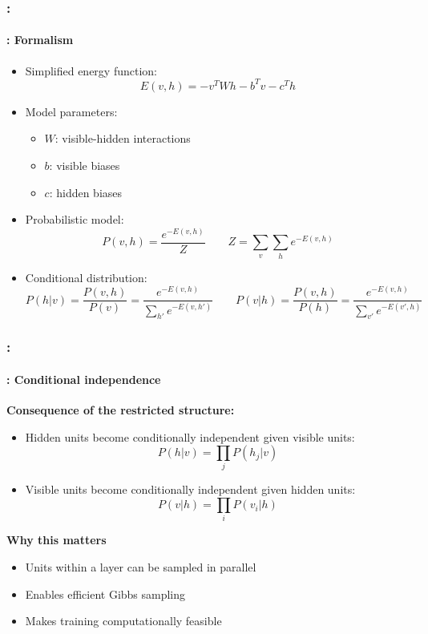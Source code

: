 \documentclass[xcolor=table]{beamer}
\begin{document}
	\begin{frame}
		\frametitle{\insertshortsubtitle: \insertsection}
		\framesubtitle{\insertsubsection: Formalism}
		
		\begin{itemize}
			
			\item Simplified energy function:
			\[
			E(v,h) = - v^T W h - b^T v - c^T h
			\]
			
			\item Model parameters:
			\begin{itemize}
				\item $W$: visible-hidden interactions
				\item $b$: visible biases
				\item $c$: hidden biases
			\end{itemize}
			
			\vspace{0.5em}
			
			\item Probabilistic model:
			\[
			P(v,h) = \frac{e^{-E(v,h)}}{Z} \quad\quad Z = \sum_v \sum_h e^{-E(v,h)}
			\]
			
			\item Conditional distribution:
			\[
			P(h|v) = \frac{P(v,h)}{P(v)} = \frac{e^{-E(v,h)}}{\sum_{h'} e^{-E(v,h')}}
			\qquad
			P(v|h) = \frac{P(v,h)}{P(h)} = \frac{e^{-E(v,h)}}{\sum_{v'} e^{-E(v',h)}}
			\]
			
		\end{itemize}
		
	\end{frame}
	
	\begin{frame}
		\frametitle{\insertshortsubtitle: \insertsection}
		\framesubtitle{\insertsubsection: Conditional independence}
		
		\textbf{Consequence of the restricted structure:}
		
		\begin{itemize}
			\item Hidden units become conditionally independent given visible units:
			\[
			P(h|v) = \prod_j P(h_j|v)
			\]
			
			\item Visible units become conditionally independent given hidden units:
			\[
			P(v|h) = \prod_i P(v_i|h)
			\]
		\end{itemize}
		
		\vspace{0.5em}
		
		\textbf{Why this matters}
		\begin{itemize}
			\item Units within a layer can be sampled in parallel
			\item Enables efficient Gibbs sampling
			\item Makes training computationally feasible
		\end{itemize}
		
	\end{frame}
	
\end{document}
